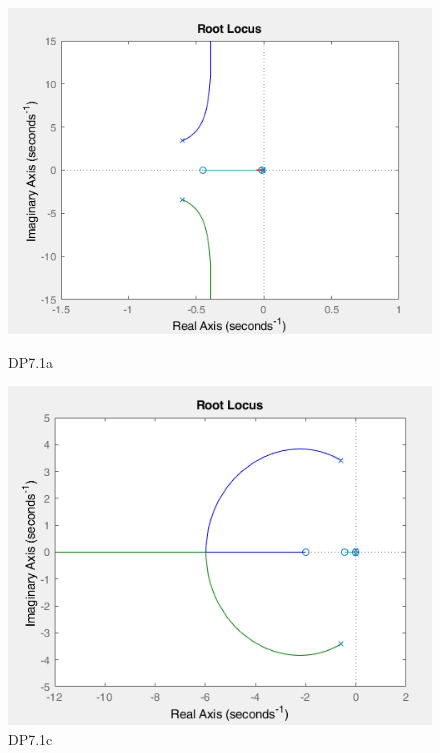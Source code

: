 \documentclass{article}
\begin{document}
\begin{center}
		\begin{figure}
			\centering
			\begin{minipage}{.5\textwidth}
				\centering
				\includegraphics[width=1.00\linewidth]{dp1a}
				\caption{DP7.1a}
			\end{minipage}%
			\begin{minipage}{.5\textwidth}
				\centering
				\includegraphics[width=1.00\linewidth]{dp1c}
				\caption{DP7.1c}
			\end{minipage}
		\end{figure}
		

\end{center}
\end{document}
